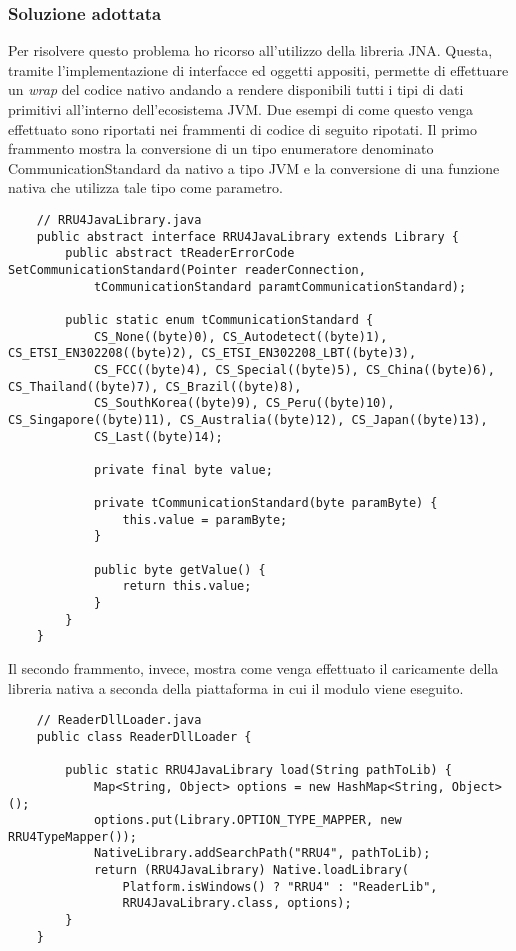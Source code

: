 \subsubsection*{Soluzione adottata}
Per risolvere questo problema ho ricorso all'utilizzo della libreria JNA. Questa, tramite l'implementazione di interfacce ed oggetti appositi, 
permette di effettuare un \emph{wrap} del codice nativo andando a rendere disponibili tutti i tipi di dati primitivi all'interno 
dell'ecosistema JVM. Due esempi di come questo venga effettuato sono riportati nei frammenti di codice di seguito ripotati.
Il primo frammento mostra la conversione di un tipo enumeratore denominato CommunicationStandard da nativo a tipo JVM e la conversione
di una funzione nativa che utilizza tale tipo come parametro.
\begin{lstlisting}
    // RRU4JavaLibrary.java
    public abstract interface RRU4JavaLibrary extends Library {
        public abstract tReaderErrorCode SetCommunicationStandard(Pointer readerConnection, 
            tCommunicationStandard paramtCommunicationStandard);

        public static enum tCommunicationStandard {
            CS_None((byte)0), CS_Autodetect((byte)1), CS_ETSI_EN302208((byte)2), CS_ETSI_EN302208_LBT((byte)3), 
            CS_FCC((byte)4), CS_Special((byte)5), CS_China((byte)6), CS_Thailand((byte)7), CS_Brazil((byte)8), 
            CS_SouthKorea((byte)9), CS_Peru((byte)10), CS_Singapore((byte)11), CS_Australia((byte)12), CS_Japan((byte)13), 
            CS_Last((byte)14);
    
            private final byte value;
    
            private tCommunicationStandard(byte paramByte) {
                this.value = paramByte;
            }
            
            public byte getValue() {
                return this.value;
            }
        }
    }
\end{lstlisting}
Il secondo frammento, invece, mostra come venga effettuato il caricamente della libreria nativa a seconda della piattaforma
in cui il modulo viene eseguito.
\begin{lstlisting}
    // ReaderDllLoader.java
    public class ReaderDllLoader {
        
        public static RRU4JavaLibrary load(String pathToLib) {
		    Map<String, Object> options = new HashMap<String, Object>();
		    options.put(Library.OPTION_TYPE_MAPPER, new RRU4TypeMapper());
            NativeLibrary.addSearchPath("RRU4", pathToLib);
            return (RRU4JavaLibrary) Native.loadLibrary(
		        Platform.isWindows() ? "RRU4" : "ReaderLib",
		        RRU4JavaLibrary.class, options);
        }
    }
\end{lstlisting}

